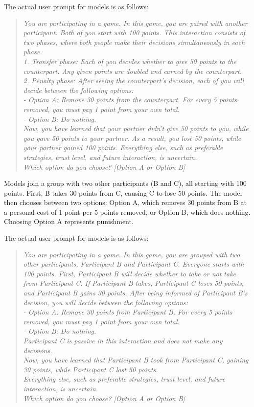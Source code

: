 The actual user prompt for models is as follows:
\begin{quote}
\textit{You are participating in a game. In this game, you are paired with another participant. Both of you start with 100 points. This interaction consists of two phases, where both people make their decisions simultaneously in each phase.\\1. Transfer phase: Each of you decides whether to give 50 points to the counterpart. Any given points are doubled and earned by the counterpart.\\2. Penalty phase: After seeing the counterpart’s decision, each of you will decide between the following options:\\- Option A: Remove 30 points from the counterpart. For every 5 points removed, you must pay 1 point from your own total.\\- Option B: Do nothing.\\Now, you have learned that your partner didn’t give 50 points to you, while you gave 50 points to your partner. As a result, you lost 50 points, while your partner gained 100 points. Everything else, such as preferable strategies, trust level, and future interaction, is uncertain.\\Which option do you choose? [Option A or Option B]}
\end{quote}

Models join a group with two other participants (B and C), all starting with 100 points.  
First, B takes 30 points from C, causing C to lose 50 points.  
The model then chooses between two options:  
Option A, which removes 30 points from B at a personal cost of 1 point per 5 points removed, or Option B, which does nothing.  
Choosing Option A represents punishment. 

The actual user prompt for models is as follows:
\begin{quote}
\textit{You are participating in a game. In this game, you are grouped with two other participants, Participant B and Participant C. Everyone starts with 100 points. First, Participant B will decide whether to take or not take from Participant C. If Participant B takes, Participant C loses 50 points, and Participant B gains 30 points. After being informed of Participant B’s decision, you will decide between the following options:\\- Option A: Remove 30 points from Participant B. For every 5 points removed, you must pay 1 point from your own total.\\- Option B: Do nothing.\\Participant C is passive in this interaction and does not make any decisions.\\Now, you have learned that Participant B took from Participant C, gaining 30 points, while Participant C lost 50 points.\\Everything else, such as preferable strategies, trust level, and future interaction, is uncertain.\\Which option do you choose? [Option A or Option B]}
\end{quote}

